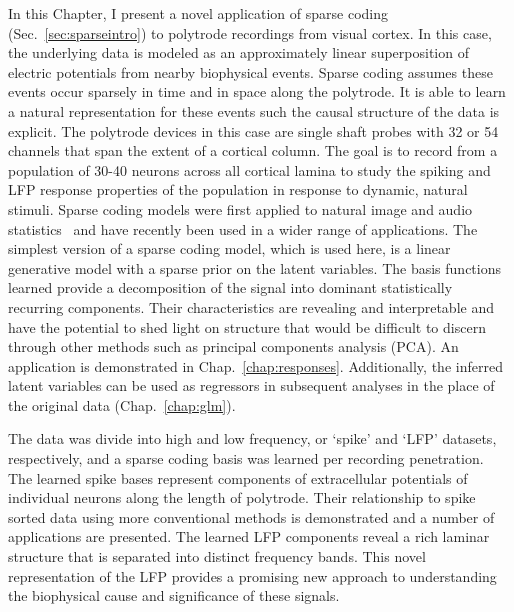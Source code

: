 In this Chapter, I present a novel application of sparse
coding~\cite{Olshausen96} (Sec.~\ref{sec:sparseintro}) to polytrode
recordings from visual cortex. In this case, the underlying data is
modeled as an approximately linear superposition of electric
potentials from nearby biophysical events.  Sparse coding assumes
these events occur sparsely in time and in space along the
polytrode. It is able to learn a natural representation for these
events such the causal structure of the data is explicit.
The polytrode devices in this case are single shaft probes with 32 or
54 channels that span the extent of a cortical column. The goal is to
record from a population of 30-40 neurons across all cortical lamina
to study the spiking and LFP response properties of the population in
response to dynamic, natural stimuli. Sparse coding models were first
applied to natural image and audio
statistics~\cite{Olshausen96,Smith:2006qf,karklin2008emergence} and
have recently been used in a wider range of applications. The simplest
version of a sparse coding model, which is used here, is a linear
generative model with a sparse prior on the latent variables. The
basis functions learned provide a decomposition of the signal into
dominant statistically recurring components. Their characteristics are
revealing and interpretable and have the potential to shed light on
structure that would be difficult to discern through other methods
such as principal components analysis (PCA). An application is
demonstrated in Chap.~\ref{chap:responses}. Additionally, the inferred
latent variables can be used as regressors in subsequent analyses in
the place of the original data (Chap.~\ref{chap:glm}).

The data was divide into high and low frequency, or `spike' and `LFP'
datasets, respectively, and a sparse coding basis was learned per
recording penetration. The learned spike bases represent components of
extracellular potentials of individual neurons along the length of
polytrode. Their relationship to spike sorted data using more
conventional methods is demonstrated and a number of applications are
presented. The learned LFP components reveal a rich laminar structure
that is separated into distinct frequency bands. This novel
representation of the LFP provides a promising new approach to
understanding the biophysical cause and significance of these signals.

